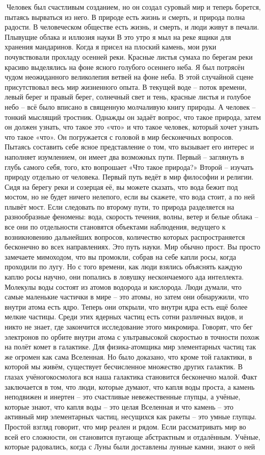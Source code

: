 \documentclass[a4paper]{book}
\begin{document}
Человек был счастливым созданием, но он создал суровый мир и теперь борется, пытаясь
вырваться из него. В природе есть жизнь и смерть, и природа полна радости. В человеческом
обществе есть жизнь, и смерть, и люди живут в печали.
Плывущие облака и иллюзия науки
В это утро я мыл на реке ящики для хранения мандаринов. Когда я присел на плоский
камень, мои руки почувствовали прохладу осенней реки. Красные листья сумаха по берегам
реки красиво выделялись на фоне ясного голубого осеннего неба. Я был потрясён чудом
неожиданного великолепия ветвей на фоне неба.
В этой случайной сцене присутствовал весь мир жизненного опыта. В текущей воде –
поток времени, левый берег и правый берег, солнечный свет и тень, красные листья и
голубое небо – всё было вписано в священную молчаливую книгу природы. А человек –
тонкий мыслящий тростник.
Однажды он задаёт вопрос, что такое природа, затем он должен узнать, что такое это
«что» и что такое человек, который хочет узнать что такое «что». Он погружается с головой в
мир бесконечных вопросов. Пытаясь составить себе ясное представление о том, что
вызывает его интерес и наполняет изумлением, он имеет два возможных пути. Первый –
заглянуть в глубь самого себя, того, кто вопрошает «Что такое природа?» Второй – изучать
природу отдельно от человека.
Первый путь ведёт в мир философии и религии. Сидя на берегу реки и созерцая её, вы
можете сказать, что вода бежит под мостом, но не будет ничего нелепого, если вы скажете,
что вода стоит, а по ней плывёт мост.
Если следовать по второму пути, то природа разделяется на разнообразные феномены:
вода, скорость течения, волны, ветер и белые облака – все они по отдельности становятся
объектами наблюдения, ведущего к возникновению дальнейших вопросов, количество
которых распространяется бесконечно во всех направлениях. Это путь науки.
Мир обычно прост. Вы просто замечаете мимоходом, что вы промокли, собрав на себе
капли росы, когда проходили по лугу. Но с того времени, как люди взялись объяснять каждую
каплю росы научно, они попались в ловушку нескончаемого ада интеллекта.
Молекулы воды состоят из атомов водорода и кислорода. Люди думали, что самые
маленькие частички в мире – это атомы, но затем они обнаружили, что внутри атома есть
ядро. Теперь они открыли, что внутри ядра есть ещё более мелкие частицы. Среди этих
ядерных частиц есть сотни различных видов, и никто не знает, где закончится исследование
этого микромира.
Говорят, что бег электронов по орбите внутри атома с ультравысокой скоростью в
точности похож на полёт комет в галактике. Для физика-атомщика мир элементарных частиц
так же огромен как сама Вселенная. Но было доказано, что кроме той галактики, в которой
мы живём, существует бесчисленное множество других галактик. В глазах учёногокосмолога вся наша галактика становится бесконечно малой.
Факт заключается в том, что люди, которые думают, что капля воды проста, а камень
неподвижен и инертен – это счастливые невежественные глупцы, а учёные, которые знают,
что капля воды – это целая Вселенная и что камень – это активный мир элементарных
частиц, несущихся как ракеты – это умные глупцы. Простой взгляд говорит, что мир реален и
рядом. Если рассматривать мир во всей его сложности, он становится пугающе абстрактным
и отдалённым.
Учёные, которые радовались, когда с Луны были доставлены лунные камни, знают о ней
\end{document}
